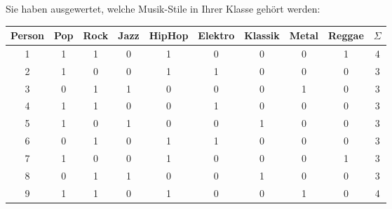 \begin{myexercise}
    Sie haben ausgewertet, welche Musik-Stile in Ihrer Klasse gehört werden:
    \begin{table}[H]
        \centering
        \begin{tabular}{c|c|c|c|c|c|c|c|c||c}
            \textbf{Person} & \textbf{Pop} & \textbf{Rock} & \textbf{Jazz} & \textbf{HipHop} & \textbf{Elektro} & \textbf{Klassik} & \textbf{Metal} & \textbf{Reggae} & $\Sigma$ \\
            \midrule\midrule
            1               & 1            & 1             & 0             & 1               & 0                & 0                & 0              & 1               & 4        \\\midrule
            2               & 1            & 0             & 0             & 1               & 1                & 0                & 0              & 0               & 3        \\\midrule
            3               & 0            & 1             & 1             & 0               & 0                & 0                & 1              & 0               & 3        \\\midrule
            4               & 1            & 1             & 0             & 0               & 1                & 0                & 0              & 0               & 3        \\\midrule
            5               & 1            & 0             & 1             & 0               & 0                & 1                & 0              & 0               & 3        \\\midrule
            6               & 0            & 1             & 0             & 1               & 1                & 0                & 0              & 0               & 3        \\\midrule
            7               & 1            & 0             & 0             & 1               & 0                & 0                & 0              & 1               & 3        \\\midrule
            8               & 0            & 1             & 1             & 0               & 0                & 1                & 0              & 0               & 3        \\\midrule
            9               & 1            & 1             & 0             & 1               & 0                & 0                & 1              & 0               & 4        \\\midrule

\end{tabular}
\end{table}
\end{myexercise}
